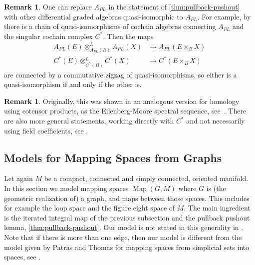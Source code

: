 \documentclass{scrartcl}
\theoremstyle{plain}
\theoremstyle{definition}
\newtheorem{remark}[theorem]{Remark}
\newcommand{\APL}{A_{PL}}
\DeclareMathOperator{\Map}{Map}
\begin{document}
\begin{remark}\label{rmk:pullback-pushout}
    One can replace $\APL$ in the statement of \cref{thm:pullback-pushout} with other differential graded algebras quasi-isomorphic to $\APL$. For example, by \cite[10.10]{felix2012rational} there is a chain of quasi-isomorphisms of cochain algebras connecting $\APL$ and the singular cochain complex $C^*$. Then the maps 
    \begin{align*}
        \APL(E)\otimes^L_{\APL(B)} \APL(X) &\to \APL(E\times_B X) \\
        C^*(E)\otimes^L_{C^*(B)} C^*(X) &\to C^*(E\times_B X)
    \end{align*}
    are connected by a commutative zigzag of quasi-isomorphisms, so either is a quasi-isomorphism if and only if the other is.
\end{remark}


\begin{remark}
    Originally, this was shown in an analogous version for homology using cotensor products, as the Eilenberg-Moore spectral sequence, see~\cite{eilenberg1966homology}. 
    There are also more general statements, working directly with $C^*$ and not necessarily using field coefficients, see \cite[Appendix A]{toen2020probl}. 
\end{remark}




\subsection{Models for Mapping Spaces from Graphs}\label{subsec:graph-models}
Let again $M$ be a compact, connected and simply connected, oriented manifold. In this section we model mapping spaces $\Map(G, M)$ where $G$ is (the geometric realization of) a graph, and maps between those spaces. This includes for example the loop space and the figure eight space of $M$. The main ingredient is the iterated integral map of the previous subsection and the pullback pushout lemma, \cref{thm:pullback-pushout}. Our model is not stated in this generality in \cite{naef2019string}. Note that if there is more than one edge, then our model is different from the model given by Patras and Thomas for mapping spaces from simplicial sets into spaces, see \cite{patras2003cochain}.
\end{document}
